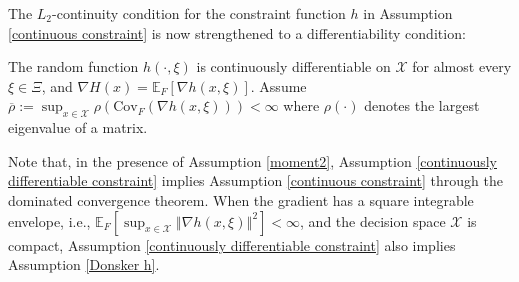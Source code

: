 \documentclass[mnsc,blindrev]{informs4} %
\newcommand{\norm}[1]{\left \Vert #1 \right\Vert}
\begin{document}
 The $L_2$-continuity condition for the constraint function $h$ in Assumption \ref{continuous constraint} is now strengthened to a differentiability condition:
 \begin{assumption}\label{continuously differentiable constraint}
 The random function $h(\cdot,\xi)$ is continuously differentiable on $\mathcal X$ for almost every $\xi\in\Xi$, and $\nabla H(x)=\mathbb E_F[\nabla h(x,\xi)]$. Assume $\overline{\rho}:=\sup_{x\in\mathcal X}\rho(\mathrm{Cov}_F(\nabla h(x,\xi)))<\infty$ where $\rho(\cdot)$ denotes the largest eigenvalue of a matrix.
 \end{assumption}
 Note that, in the presence of Assumption \ref{moment2}, Assumption \ref{continuously differentiable constraint} implies Assumption \ref{continuous constraint} through the dominated convergence theorem. When the gradient has a square integrable envelope, i.e., $\mathbb E_F[\sup_{x\in\mathcal X}\norm{\nabla h(x,\xi)}^2]<\infty$, and the decision space $\mathcal X$ is compact, Assumption \ref{continuously differentiable constraint} also implies Assumption \ref{Donsker h}.
\end{document}
